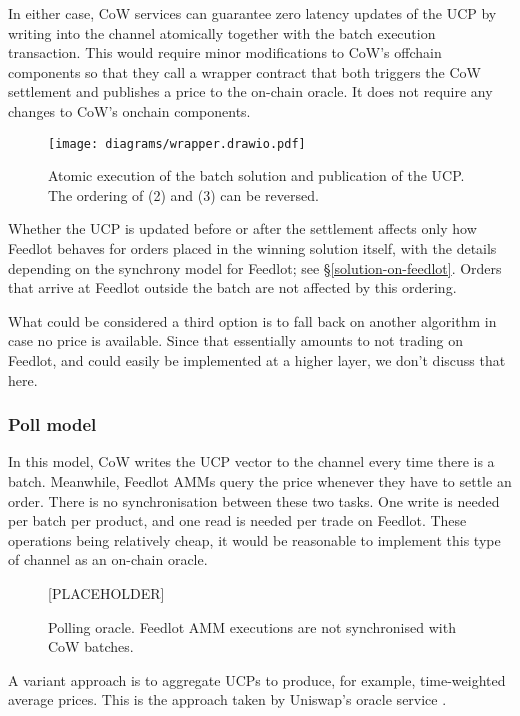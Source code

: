 \documentclass[a4paper,10pt]{article}
\begin{document}
In either case, CoW services can guarantee zero latency updates of the UCP by writing into the channel atomically together with the batch execution transaction. 
%
This would require minor modifications to CoW's offchain components so that they call a wrapper contract that both triggers the CoW settlement and publishes a price to the on-chain oracle.
%
It does not require any changes to CoW's onchain components.
%
\begin{figure}
  \begin{center}
    \vspace{2ex}
    \texttt{[image: diagrams/wrapper.drawio.pdf]}
    \caption{Atomic execution of the batch solution and publication of the UCP. The ordering of (2) and (3) can be reversed.}
  \end{center}
\end{figure}
%
Whether the UCP is updated before or after the settlement affects only how Feedlot behaves for orders placed in the winning solution itself, with the details depending on the synchrony model for Feedlot; see \S\ref{solution-on-feedlot}.
%
Orders that arrive at Feedlot outside the batch are not affected by this ordering.

What could be considered a third option is to fall back on another algorithm in case no price is available. 
%
Since that essentially amounts to not trading on Feedlot, and could easily be implemented at a higher layer, we don't discuss that here.

\subsubsection{Poll model}

In this model, CoW writes the UCP vector to the channel every time there is a batch. Meanwhile, Feedlot AMMs query the price whenever they have to settle an order.
%
There is no synchronisation between these two tasks.
%
One write is needed per batch per product, and one read is needed per trade on Feedlot.
%
These operations being relatively cheap, it would be reasonable to implement this type of channel as an on-chain oracle.
%
\begin{figure}
  \begin{center}
    [PLACEHOLDER]%
    \caption{Polling oracle. Feedlot AMM executions are not synchronised with CoW batches.}
  \end{center}
\end{figure}
%
A variant approach is to aggregate UCPs to produce, for example, time-weighted average prices. This is the approach taken by Uniswap's oracle service \cite{adams2020uniswap}.
\end{document}
